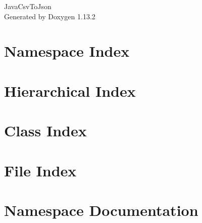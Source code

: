 \documentclass[twoside]{book}
\newcommand{\+}{\discretionary{\mbox{\scriptsize$\hookleftarrow$}}{}{}}
\newcommand{\clearemptydoublepage}{%
    \newpage{\pagestyle{empty}\cleardoublepage}%
  }
\begin{document}
  \raggedbottom
    \hypersetup{pageanchor=false,
                bookmarksnumbered=true,
                pdfencoding=unicode
               }
  \begin{titlepage}
  \vspace*{7cm}
  \begin{center}%
  {\Large Java\+Csv\+To\+Json}\\
  \vspace*{1cm}
  {\large Generated by Doxygen 1.13.2}\\
  \end{center}
  \end{titlepage}
  \clearemptydoublepage
  \tableofcontents
  \clearemptydoublepage
  \hypersetup{pageanchor=true}

\chapter{Namespace Index}

\chapter{Hierarchical Index}

\chapter{Class Index}

\chapter{File Index}

\chapter{Namespace Documentation}

\end{document}
